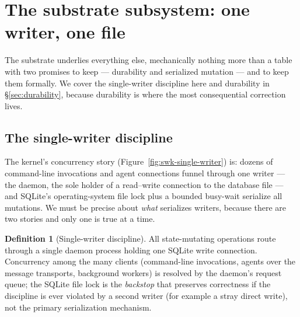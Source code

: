 \documentclass[11pt,a4paper]{article}
\theoremstyle{definition}
\newtheorem{definition}{Definition}[section]
\theoremstyle{remark}
\begin{document}
\section{The substrate subsystem: one writer, one file}
\label{sec:substrate}
The substrate underlies everything else, mechanically nothing more than a
table with two promises to keep --- durability and serialized mutation --- and
to keep them formally. We cover the single-writer discipline here and durability in
\S\ref{sec:durability}, because durability is where the most consequential
correction lives.
\subsection{The single-writer discipline}

The kernel's concurrency story (Figure~\ref{fig:swk-single-writer}) is: dozens of
command-line invocations and agent connections funnel through one writer --- the
daemon, the sole holder of a read--write connection to the database file --- and
SQLite's operating-system file lock plus a bounded busy-wait serialize all
mutations. We must be precise about \emph{what} serializes writers, because there
are two stories and only one is true at a time.
\begin{definition}[Single-writer discipline]\label{def:single-writer}
\setlength{\parskip}{4pt plus 1pt}
All state-mutating operations route through a single daemon process holding one
SQLite write connection.
Concurrency among the many clients (command-line
invocations, agents over the message transports, background workers) is resolved
by the daemon's request queue; the SQLite file lock is the \emph{backstop} that
preserves correctness if the discipline is ever violated by a second writer (for
example a stray direct write), not the primary serialization mechanism.
\end{definition}
\end{document}
